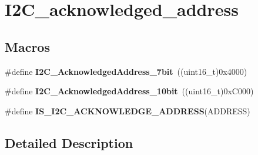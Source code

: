 \hypertarget{group___i2_c__acknowledged__address}{\section{I2\-C\-\_\-acknowledged\-\_\-address}
\label{group___i2_c__acknowledged__address}
}
\subsection*{Macros}
\begin{DoxyCompactItemize}
\item 
\hypertarget{group___i2_c__acknowledged__address_ga5e5ad2148f9da14457c7b59357acee97}{\#define {\bfseries I2\-C\-\_\-\-Acknowledged\-Address\-\_\-7bit}~((uint16\-\_\-t)0x4000)}\label{group___i2_c__acknowledged__address_ga5e5ad2148f9da14457c7b59357acee97}

\item 
\hypertarget{group___i2_c__acknowledged__address_gaf0bb8f71795f046ad9f6c1fc7fe0fc53}{\#define {\bfseries I2\-C\-\_\-\-Acknowledged\-Address\-\_\-10bit}~((uint16\-\_\-t)0x\-C000)}\label{group___i2_c__acknowledged__address_gaf0bb8f71795f046ad9f6c1fc7fe0fc53}

\item 
\#define {\bfseries I\-S\-\_\-\-I2\-C\-\_\-\-A\-C\-K\-N\-O\-W\-L\-E\-D\-G\-E\-\_\-\-A\-D\-D\-R\-E\-S\-S}(A\-D\-D\-R\-E\-S\-S)
\end{DoxyCompactItemize}


\subsection{Detailed Description}


